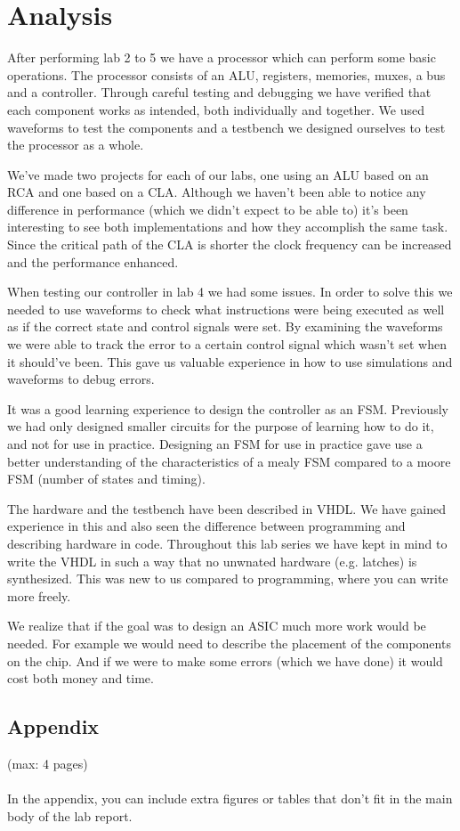 \documentclass[a4paper,11pt]{article}
\begin{document}
\newpage
\section{Analysis}

After performing lab 2 to 5 we have a processor which can perform some basic operations. The processor consists of an ALU, registers, memories, muxes, a bus and a controller. Through careful testing and debugging we have verified that each component works as intended, both individually and together. We used waveforms to test the components and a testbench we designed ourselves to test the processor as a whole.

We've made two projects for each of our labs, one using an ALU based on an RCA and one based on a CLA. Although we haven't been able to notice any difference in performance (which we didn't expect to be able to) it's been interesting to see both implementations and how they accomplish the same task. Since the critical path of the CLA is shorter the clock frequency can be increased and the performance enhanced.
 
When testing our controller in lab 4 we had some issues. In order to solve this we needed to use waveforms to check what instructions were being executed as well as if the correct state and control signals were set. By examining the waveforms we were able to track the error to a certain control signal which wasn't set when it should've been. This gave us valuable experience in how to use simulations and waveforms to debug errors.

It was a good learning experience to design the controller as an FSM. Previously we had only designed smaller circuits for the purpose of learning how to do it, and not for use in practice. Designing an FSM for use in practice gave use a better understanding of the characteristics of a mealy FSM compared to a moore FSM (number of states and timing).

The hardware and the testbench have been described in VHDL. We have gained experience in this and also seen the difference between programming and describing hardware in code. Throughout this lab series we have kept in mind to write the VHDL in such a way that no unwnated  hardware (e.g. latches) is synthesized. This was new to us compared to programming, where you can write more freely.

We realize that if the goal was to design an ASIC much more work would be needed. For example we would need to describe the placement of the components on the chip. And if we were to make some errors (which we have done) it would cost both money and time.

\newpage
\begin{appendix}

\section{Appendix}
(max: 4 pages)
\\\\
In the appendix, you can include extra figures or tables that don't fit in the main body of the lab report. 

\end{appendix}
\end{document}
